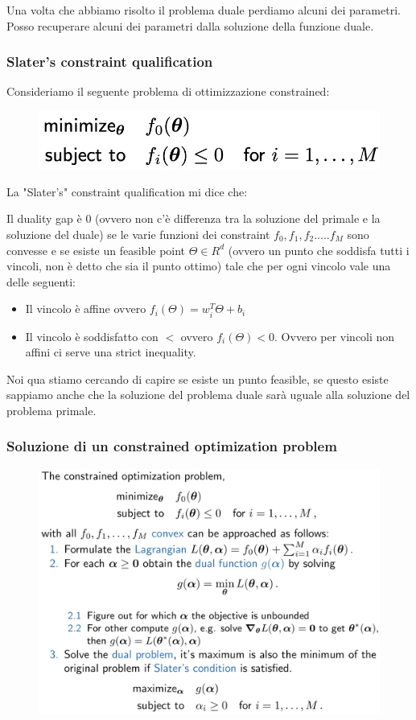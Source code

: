 \documentclass[14pt]{extreport}
\begin{document}
Una volta che abbiamo risolto il problema duale perdiamo alcuni dei parametri. Posso recuperare alcuni dei parametri dalla soluzione della funzione
duale.

\subsubsection{Slater's constraint qualification}

Consideriamo il seguente problema di ottimizzazione constrained:

\begin{figure}[H]
\centering
\includegraphics[width=0.7\linewidth]{304.jpeg}
\end{figure}

La "Slater's" constraint qualification mi dice che:

Il duality gap è 0 (ovvero non c'è differenza tra la soluzione del primale e la soluzione del duale) se le varie funzioni dei constraint $f_0, f_1,
f_2.....f_M$ sono convesse e se esiste un feasible point $\Theta \in R^d$ (ovvero un punto che soddisfa tutti i vincoli, non è detto che sia il punto
ottimo) tale che per ogni vincolo vale una delle seguenti:
\begin{itemize}
\item Il vincolo è affine ovvero $f_i(\Theta) = w^T_i\Theta + b_i$
\item Il vincolo è soddisfatto con $<$ ovvero $f_i(\Theta)<0$. Ovvero per vincoli non affini ci serve una strict inequality.
\end{itemize}

Noi qua stiamo cercando di capire se esiste un punto feasible, se questo esiste sappiamo anche che la soluzione del problema duale sarà uguale alla
soluzione del problema primale.


\subsubsection{Soluzione di un constrained optimization problem}

\begin{figure}[H]
\centering
\includegraphics[width=0.7\linewidth]{305.jpeg}
\end{figure}
\end{document}
